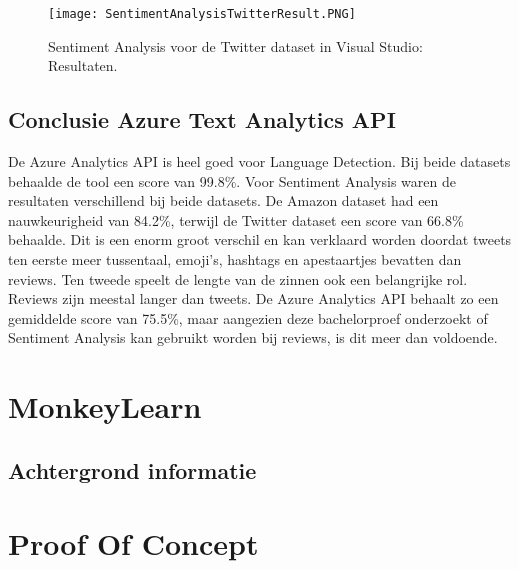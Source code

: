 \begin{figure}[!htbp]
    \texttt{[image: SentimentAnalysisTwitterResult.PNG]}
    \caption{\label{azuresentimentanalysistwitterresults}Sentiment Analysis voor de Twitter dataset in Visual Studio: Resultaten.}
\end{figure}
\FloatBarrier 

\subsection{Conclusie Azure Text Analytics API}
\label{conclusieAzure}
De Azure Analytics API is heel goed voor Language Detection. Bij beide datasets behaalde de tool een score van 99.8\%. Voor Sentiment Analysis waren de resultaten verschillend bij beide datasets. De Amazon dataset had een nauwkeurigheid van 84.2\%, terwijl de Twitter dataset een score van 66.8\% behaalde. Dit is een enorm groot verschil en kan verklaard worden doordat tweets ten eerste meer tussentaal, emoji's, hashtags en apestaartjes bevatten dan reviews. Ten tweede speelt de lengte van de zinnen ook een belangrijke rol. Reviews zijn meestal langer dan tweets. De Azure Analytics API behaalt zo een gemiddelde score van 75.5\%, maar aangezien deze bachelorproef onderzoekt of Sentiment Analysis kan gebruikt worden bij reviews, is dit meer dan voldoende. 
\section{MonkeyLearn}

\subsection{Achtergrond informatie}
\label{achtergrondinformatiemonkeylearn}

\section{Proof Of Concept}

